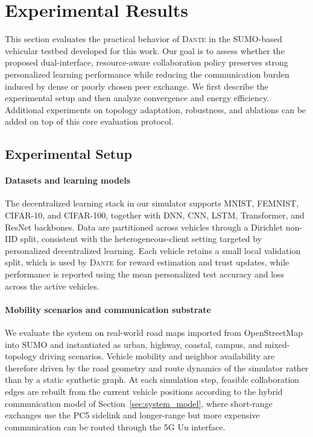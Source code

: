 \section{Experimental Results}
\label{sec:experiments}

This section evaluates the practical behavior of \textsc{Dante} in the SUMO-based vehicular testbed developed for this work. Our goal is to assess whether the proposed dual-interface, resource-aware collaboration policy preserves strong personalized learning performance while reducing the communication burden induced by dense or poorly chosen peer exchange. We first describe the experimental setup and then analyze convergence and energy efficiency. Additional experiments on topology adaptation, robustness, and ablations can be added on top of this core evaluation protocol.

\subsection{Experimental Setup}

\paragraph{Datasets and learning models}
The decentralized learning stack in our simulator supports MNIST, FEMNIST, CIFAR-10, and CIFAR-100, together with DNN, CNN, LSTM, Transformer, and ResNet backbones. Data are partitioned across vehicles through a Dirichlet non-IID split, consistent with the heterogeneous-client setting targeted by personalized decentralized learning. Each vehicle retains a small local validation split, which is used by \textsc{Dante} for reward estimation and trust updates, while performance is reported using the mean personalized test accuracy and loss across the active vehicles.

\paragraph{Mobility scenarios and communication substrate}
We evaluate the system on real-world road maps imported from OpenStreetMap into SUMO and instantiated as urban, highway, coastal, campus, and mixed-topology driving scenarios. Vehicle mobility and neighbor availability are therefore driven by the road geometry and route dynamics of the simulator rather than by a static synthetic graph. At each simulation step, feasible collaboration edges are rebuilt from the current vehicle positions according to the hybrid communication model of Section~\ref{sec:system_model}, where short-range exchanges use the PC5 sidelink and longer-range but more expensive communication can be routed through the 5G Uu interface.

